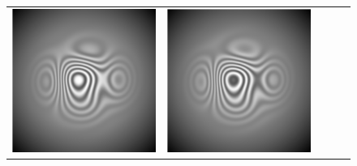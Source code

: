 \documentclass[letterpaper,12pt]{article}   %
\begin{document}
\begin{figure}[th]
\begin{center}
\begin{tabular}{ c c c c c }
  \includegraphics[scale=0.20]{figures/Interferograma3.png}}&
\includegraphics[scale=0.20]{figures/Interferograma4.png}}&

\end{tabular}
\end{center}
\end{figure}
\end{document}
